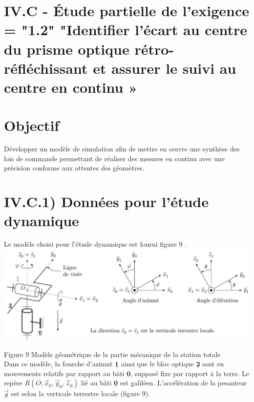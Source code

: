 \documentclass[10pt]{article}
\begin{document}
\section*{IV.C - Étude partielle de l'exigence = "1.2" "Identifier l'écart au centre du prisme optique rétro-réfléchissant et assurer le suivi au centre en continu »}
\section*{Objectif}
Développer un modèle de simulation afin de mettre en œuvre une synthèse des lois de commande permettant de réaliser des mesures en continu avec une précision conforme aux attentes des géomètres.

\section*{IV.C.1) Données pour l'étude dynamique}
Le modèle choisi pour l'étude dynamique est fourni figure 9 .\\
\includegraphics[max width=\textwidth, center]{2024_12_07_51b7f57c7f055c2d8d29g-06}

Figure 9 Modèle géométrique de la partie mécanique de la station totale\\
Dans ce modèle, la fourche d'azimut $\underline{\mathbf{1}}$ ainsi que le bloc optique $\underline{\mathbf{2}}$ sont en mouvements relatifs par rapport au bâti $\underline{\mathbf{0}}$, supposé fixe par rapport à la terre. Le repère $R\left(O ; \vec{x}_{0}, \vec{y}_{0}, \vec{z}_{0}\right)$ lié au bâti $\underline{\mathbf{0}}$ est galiléen. L'accélération de la pesanteur $\vec{g}$ est selon la verticale terrestre locale (figure 9).
\end{document}
